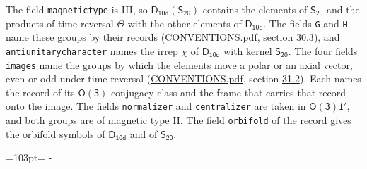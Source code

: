 \documentclass[10pt,a4paper]{article}
\newcommand{\needspace}[1]{\par\penalty-100\begingroup\dimen0=#1\relax\dimen2=\pagegoal
  \advance\dimen2-\pagetotal\ifdim\dimen0>\dimen2\relax\ifdim\dimen2>0pt\vfil\break\fi\fi
  \endgroup}
\numberwithin{equation}{section}
\newcommand{\grp}[1]{\mathsf{#1}}
\begin{document}
The field \texttt{magnetictype} is III, so $\grp{D_{10d}}(\grp{S_{20}})$ contains the elements of $\grp{S_{20}}$ and the products of time reversal $\varTheta$ with the other elements of $\grp{D_{10d}}$. The fields \texttt{G} and \texttt{H} name these groups by their records (\href{../../CONVENTIONS.pdf}{CONVENTIONS.pdf}, section \href{../../CONVENTIONS.pdf\#conv.30.3}{30.3}), and \texttt{antiunitarycharacter} names the irrep $\chi$ of $\grp{D_{10d}}$ with kernel $\grp{S_{20}}$. The four fields \texttt{images} name the groups by which the elements move a polar or an axial vector, even or odd under time reversal (\href{../../CONVENTIONS.pdf}{CONVENTIONS.pdf}, section \href{../../CONVENTIONS.pdf\#conv.31.2}{31.2}). Each names the record of its $\grp{O(3)}$-conjugacy class and the frame that carries that record onto the image. The fields \texttt{normalizer} and \texttt{centralizer} are taken in $\grp{O(3)1'}$, and both groups are of magnetic type II. The field \texttt{orbifold} of the record gives the orbifold symbols of $\grp{D_{10d}}$ and of $\grp{S_{20}}$.
\needspace{103pt}
\end{document}
